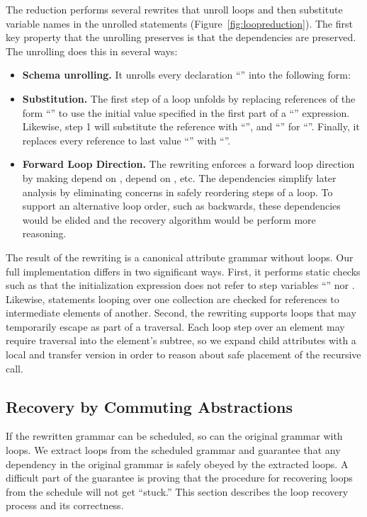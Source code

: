The reduction performs several rewrites that unroll loops and then substitute variable names in the unrolled statements (Figure~\ref{fig:loopreduction}). The first key property that the unrolling preserves is that the dependencies are preserved. The unrolling does this in several ways:
\begin{itemize}
\item \textbf{Schema unrolling.} It unrolls every declaration ``'' into the following form:
 
\item \textbf{Substitution.} The first step of a loop unfolds by replacing references of the form ``'' to use the initial value specified in the first part of a ``'' expression. Likewise, step 1 will substitute the reference with ``'', and ``'' for ``''. Finally, it replaces every reference to last value ``'' with ``''.

\item \textbf{Forward Loop Direction.} The rewriting enforces a forward loop direction by making  depend on ,  depend on , etc. The dependencies simplify later analysis by eliminating concerns in safely reordering steps of a loop. To support an alternative loop order, such as backwards, these dependencies would be elided and the recovery algorithm would be perform more reasoning.
\end{itemize}

The result of the rewriting is a canonical attribute grammar without loops. Our full implementation differs in two significant ways. First, it performs static checks such as that the  initialization expression does not refer to step variables ``'' nor . Likewise, statements looping over one collection are checked for references to intermediate elements of another. Second, the rewriting supports loops that may temporarily escape as part of a  traversal. Each loop step over an element may require traversal into the element's subtree, so we expand child attributes with a local and transfer version in order to reason about safe placement of the recursive call. 


\subsection{Recovery by Commuting Abstractions}
If the rewritten grammar can be scheduled, so can the original grammar with loops. We extract loops from the scheduled grammar and guarantee that any dependency in the original grammar is safely obeyed by the extracted loops. A difficult part of the guarantee is proving that the procedure for recovering loops from the schedule will not get ``stuck.'' This section describes the loop recovery process and its correctness.


